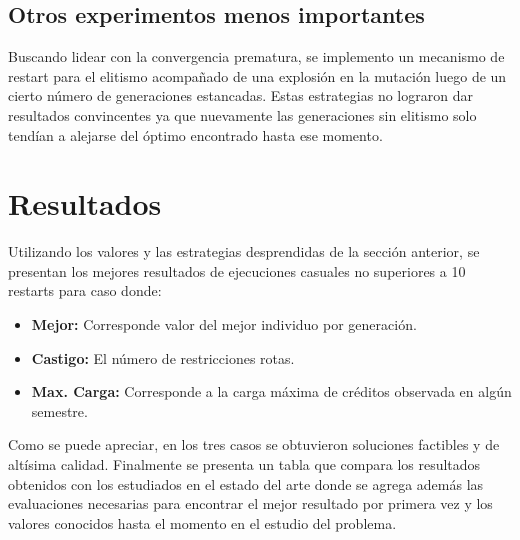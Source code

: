 \documentclass[letter, 10pt]{article}
\begin{document}
\begin{center}
  
\end{center}


\subsection{Otros experimentos menos importantes}
Buscando lidear con la convergencia prematura, se implemento un mecanismo de
restart para el elitismo acompañado de una explosión en la  mutación luego de un cierto
número de generaciones estancadas. Estas estrategias no lograron dar resultados
convincentes ya que nuevamente las generaciones sin elitismo solo tendían a
alejarse del óptimo encontrado hasta ese momento.



\section{Resultados}
Utilizando los valores y las estrategias desprendidas de la sección anterior, se
presentan los mejores resultados de ejecuciones casuales no superiores a 10
restarts para caso donde:

\begin{itemize}
  \item \textbf{Mejor:} Corresponde valor del mejor individuo por generación.
  \item \textbf{Castigo:} El número de restricciones rotas.
  \item \textbf{Max. Carga:} Corresponde a la carga máxima de créditos observada en algún semestre.
\end{itemize}

\begin{center}

\end{center}
\begin{center}

\end{center}
\begin{center}

\end{center}

Como se puede apreciar, en los tres casos se obtuvieron soluciones factibles y
de altísima calidad.  Finalmente se presenta un tabla que compara los resultados
obtenidos con los estudiados en el estado del arte donde se agrega además las
evaluaciones necesarias para encontrar el mejor resultado por primera vez y los
valores conocidos hasta el momento en el estudio del problema.
\end{document}
